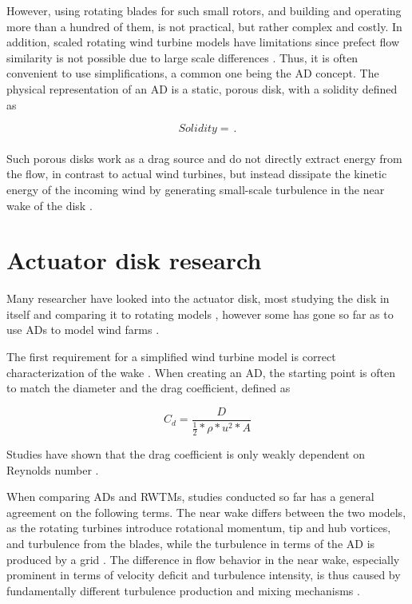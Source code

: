 However, using rotating blades for such small rotors, and building and operating more than a hundred of them, is not practical, but rather complex and costly. In addition, scaled rotating wind turbine models have limitations since prefect flow similarity is not possible due to large scale differences \cite{Bossuyt2016}. Thus, it is often convenient to use simplifications, a common one being the \gls{AD} concept. The physical representation of an \gls{AD} is a static, porous disk, with a solidity defined as 

\begin{equation}
    Solidity = \frac{}{}.
\end{equation}

Such porous disks work as a drag source and do not directly extract energy from the flow, in contrast to actual wind turbines, but instead dissipate the kinetic energy of the incoming wind by generating small-scale turbulence in the near wake of the disk \cite{Lignarolo2016}. 


\section{Actuator disk research}

Many researcher have looked into the actuator disk, most studying the disk in itself and comparing it to rotating models \cite{Lignarolo2014} \cite{Blackmore2013} \cite{Pierella2010} \cite{Aubrun2019} \cite{Cannon1993}  \cite{Sforza1981} \cite{Neunaber} \cite{Aubrun2013}, however some has gone so far as to use \gls{AD}s to model wind farms \cite{Bossuyt2016} \cite{Theunissen2014} \cite{Theunissen2018}. 

The first requirement for a simplified wind turbine model is correct characterization of the wake \cite{Theunissen2014}. When creating an \gls{AD}, the starting point is often to match the diameter and the drag coefficient, defined as

\begin{equation}
    C_d = \frac{D}{\frac{1}{2}*\rho*u^2*A}
    \label{Eq:Cd}
\end{equation}

Studies have shown that the drag coefficient is only weakly dependent on Reynolds number \cite{Blackmore2013}. 

When comparing \gls{AD}s and \gls{RWTM}s, studies conducted so far has a general agreement on the following terms. The near wake differs between the two models, as the rotating turbines introduce rotational momentum, tip and hub vortices, and turbulence from the blades, while the turbulence in terms of the \gls{AD} is produced by a grid \cite{Zhang2012} \cite{Lignarolo2014} \cite{Barthelmie2009}. The difference in flow behavior in the near wake, especially prominent in terms of velocity deficit and turbulence intensity, is thus caused by fundamentally different turbulence production and mixing mechanisms \cite{Aubrun2019} \cite{Lignarolo2016} \cite{Barthelmie2010}.

